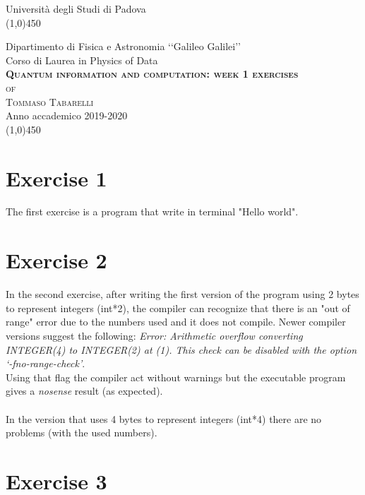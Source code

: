 \documentclass[11pt, a4paper]{report}
\begin{document}
\begin{titlepage}

\begin{center}
\LARGE{Università degli Studi di Padova}\\
\line(1,0){450}\\
\begin{figure}[H]
\centering

\end{figure}
\vspace{-0.2em}
\Large{Dipartimento di Fisica e Astronomia ‘‘Galileo Galilei’’}\\
\vspace{2em}
\Large{Corso di Laurea in Physics of Data}\\
\vspace{8em}
\Huge{\textsc{\textbf{Quantum information and computation: week 1 exercises}}}\\
\vspace{2em}
\LARGE{\textsc{of}}\\
\vspace{1em}
\huge{\textsc{Tommaso Tabarelli}}\\
\vspace{11em}
\LARGE{Anno accademico 2019-2020}\\
\line(1,0){450}
\end{center}

\end{titlepage}




\section*{Exercise 1}
The first exercise is a program that write in terminal "Hello world".

\section*{Exercise 2}
In the second exercise, after writing the first version of the program using 2 bytes to represent integers (int*2), the compiler can recognize that there is an "out of range" error due to the numbers used and it does not compile. Newer compiler versions suggest the following:
\textit{Error: Arithmetic overflow converting INTEGER(4) to INTEGER(2) at (1). This check can be disabled with the option ‘-fno-range-check’}.\\
Using that flag the compiler act without warnings but the executable program gives a \textit{nosense} result (as expected).\\ \\
In the version that uses 4 bytes to represent integers (int*4) there are no problems (with the used numbers).

\section*{Exercise 3}
\end{document}
